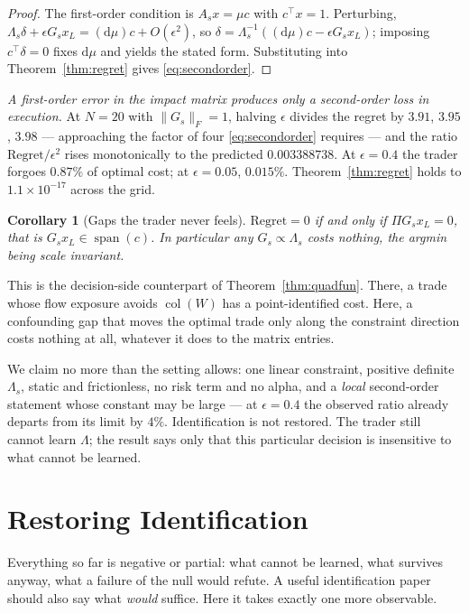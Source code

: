 \documentclass[10pt,twocolumn]{article}
\newtheorem{corollary}{Corollary}
\theoremstyle{remark}
\newcommand{\col}{\operatorname{col}}
\newcommand{\spann}{\operatorname{span}}
\begin{document}
\begin{proof}
The first-order condition is $A_sx=\mu c$ with $c^\top x=1$. Perturbing,
$\Lambda_s\delta+\epsilon G_sx_L=(\mathrm d\mu)c+O(\epsilon^2)$, so
$\delta=\Lambda_s^{-1}((\mathrm d\mu)c-\epsilon G_sx_L)$; imposing
$c^\top\delta=0$ fixes $\mathrm d\mu$ and yields the stated form. Substituting
into Theorem~\ref{thm:regret} gives \eqref{eq:secondorder}.
\end{proof}

\emph{A first-order error in the impact matrix produces only a second-order
loss in execution.} At $N=20$ with $\lVert G_s\rVert_F=1$, halving $\epsilon$
divides the regret by $3.91$, $3.95$, $3.98$ --- approaching the factor of four
\eqref{eq:secondorder} requires --- and the ratio
$\mathrm{Regret}/\epsilon^2$ rises monotonically to the predicted
$0.003388738$. At $\epsilon=0.4$ the trader forgoes $0.87\%$ of optimal cost;
at $\epsilon=0.05$, $0.015\%$. Theorem~\ref{thm:regret} holds to
$1.1\times10^{-17}$ across the grid.

\begin{corollary}[Gaps the trader never feels]
\label{cor:freegap}
$\mathrm{Regret}=0$ if and only if $\Pi G_sx_L=0$, that is
$G_sx_L\in\spann(c)$. In particular any $G_s\propto\Lambda_s$ costs nothing,
the argmin being scale invariant.
\end{corollary}

This is the decision-side counterpart of Theorem~\ref{thm:quadfun}. There, a
trade whose flow exposure avoids $\col(W)$ has a point-identified cost. Here, a
confounding gap that moves the optimal trade only along the constraint
direction costs nothing at all, whatever it does to the matrix entries.

We claim no more than the setting allows: one linear constraint, positive
definite $\Lambda_s$, static and frictionless, no risk term and no alpha, and a
\emph{local} second-order statement whose constant may be large --- at
$\epsilon=0.4$ the observed ratio already departs from its limit by $4\%$.
Identification is not restored. The trader still cannot learn $\Lambda$; the
result says only that this particular decision is insensitive to what cannot
be learned.

\section{Restoring Identification}
\label{sec:restore}

Everything so far is negative or partial: what cannot be learned, what survives
anyway, what a failure of the null would refute. A useful identification paper
should also say what \emph{would} suffice. Here it takes exactly one more
observable.
\end{document}
